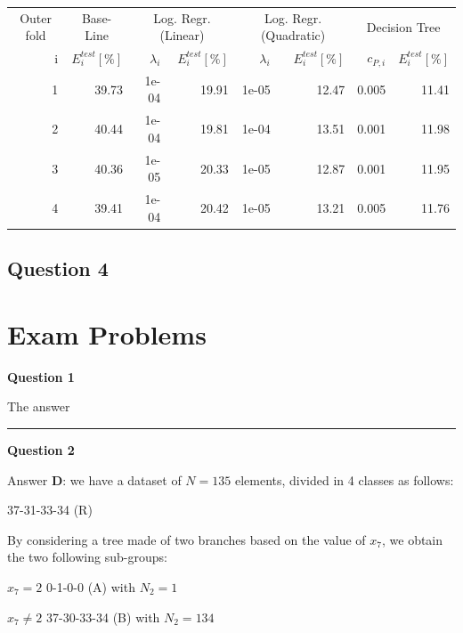 \documentclass[
]{article}
\begin{document}
\begin{tabular}{rrrrrrrr}
\toprule
\multicolumn{1}{c}{Outer fold} & \multicolumn{1}{c}{Base-Line} & \multicolumn{2}{c}{Log. Regr. (Linear)} & \multicolumn{2}{c}{Log. Regr. (Quadratic)} & \multicolumn{2}{c}{Decision Tree} \\
\cmidrule(l{3pt}r{3pt}){1-1} \cmidrule(l{3pt}r{3pt}){2-2} \cmidrule(l{3pt}r{3pt}){3-4} \cmidrule(l{3pt}r{3pt}){5-6} \cmidrule(l{3pt}r{3pt}){7-8}
i & {$E_i^{test} [\%]$} & {$\lambda_i$} & {$E_i^{test} [\%]$} & {$\lambda_i$} & {$E_i^{test} [\%]$} & {$c_{P,i}$} & {$E_i^{test} [\%]$}\\
\midrule
1 & 39.73 & 1e-04 & 19.91 & 1e-05 & 12.47 & 0.005 & 11.41\\
2 & 40.44 & 1e-04 & 19.81 & 1e-04 & 13.51 & 0.001 & 11.98\\
3 & 40.36 & 1e-05 & 20.33 & 1e-05 & 12.87 & 0.001 & 11.95\\
4 & 39.41 & 1e-04 & 20.42 & 1e-05 & 13.21 & 0.005 & 11.76\\
\bottomrule
\end{tabular}

\hypertarget{question-4}{%
\subsection{Question 4}\label{question-4}}

\newpage

\hypertarget{exam-problems}{%
\section{Exam Problems}\label{exam-problems}}

\textbf{Question 1}

The answer

\begin{center}\rule{0.5\linewidth}{0.5pt}\end{center}

\textbf{Question 2}

Answer \textbf{D}: we have a dataset of \(N=135\) elements, divided in 4
classes as follows:

37-31-33-34 (R)

By considering a tree made of two branches based on the value of
\(x_7\), we obtain the two following sub-groups:

\(x_7=2\) 0-1-0-0 (A) with \(N_2=1\)

\(x_7 \neq 2\) 37-30-33-34 (B) with \(N_2=134\)
\end{document}
